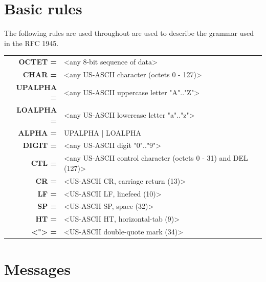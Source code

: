 \section{Basic rules}
The following rules are used throughout are used to describe the grammar used in the RFC 1945.
\begin{table}[h]
\centering
\footnotesize
\begin{tabular}{rl}
\textbf{OCTET =}& <any 8-bit sequence of data>\\
\textbf{CHAR =}& <any US-ASCII character (octets 0 - 127)>\\
\textbf{UPALPHA =}& <any US-ASCII uppercase letter "A".."Z">\\
\textbf{LOALPHA =}& <any US-ASCII lowercase letter "a".."z">\\
\textbf{ALPHA =}& UPALPHA | LOALPHA\\
\textbf{DIGIT =}& <any US-ASCII digit "0".."9">\\
\textbf{CTL =}& <any US-ASCII control character (octets 0 - 31) and DEL (127)>\\
\textbf{CR =}& <US-ASCII CR, carriage return (13)>\\
\textbf{LF =}& <US-ASCII LF, linefeed (10)>\\
\textbf{SP =}& <US-ASCII SP, space (32)>\\
\textbf{HT =}& <US-ASCII HT, horizontal-tab (9)>\\
\textbf{<"> =}& <US-ASCII double-quote mark (34)>\\
\end{tabular}
\end{table}

\section{Messages}
